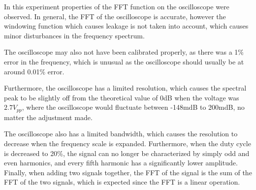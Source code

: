 In this experiment properties of the FFT function on the oscilloscope were observed. In general, the FFT of the oscilloscope is accurate, however the windowing function which causes leakage is not taken into account, which causes minor disturbances in the frequency spectrum.

The oscilloscope may also not have been calibrated properly, as there was a 1\% error in the frequency, which is unusual as the oscilloscope should usually be at around 0.01\% error.

Furthermore, the oscilloscope has a limited resolution, which causes the spectral peak to be slightly off from the theoretical value of 0dB when the voltage was $2.7V_{pp}$, where the oscilloscope would fluctuate between -148mdB to 200mdB, no matter the adjustment made.

The oscilloscope also has a limited bandwidth, which causes the resolution to decrease when the frequency scale is expanded. Furthermore, when the duty cycle is decreased to 20\%, the signal can no longer be characterized by simply odd and even harmonics, and every fifth harmonic has a significantly lower amplitude. Finally, when adding two signals together, the FFT of the signal is the sum of the FFT of the two signals, which is expected since the FFT is a linear operation.